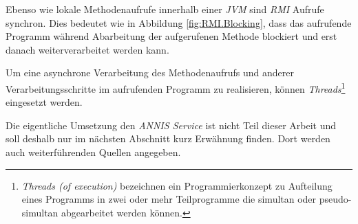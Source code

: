 Ebenso wie lokale Methodenaufrufe innerhalb einer \emph{JVM} sind \emph{RMI} Aufrufe synchron. Dies bedeutet wie in Abbildung \ref{fig:RMI.Blocking}, dass das aufrufende Programm während Abarbeitung der aufgerufenen Methode blockiert und erst danach weiterverarbeitet werden kann.

Um eine asynchrone Verarbeitung des Methodenaufrufs und anderer Verarbeitungsschritte im aufrufenden Programm zu realisieren, können \emph{Threads}\footnote{\emph{Threads (of execution)} bezeichnen ein Programmierkonzept zu Aufteilung eines Programms in zwei oder mehr Teilprogramme die simultan oder pseudo-simultan abgearbeitet werden können.} eingesetzt werden.

Die eigentliche Umsetzung den \emph{ANNIS Service} ist nicht Teil dieser Arbeit und soll deshalb nur im nächsten Abschnitt kurz Erwähnung finden. Dort werden auch weiterführenden Quellen angegeben.


